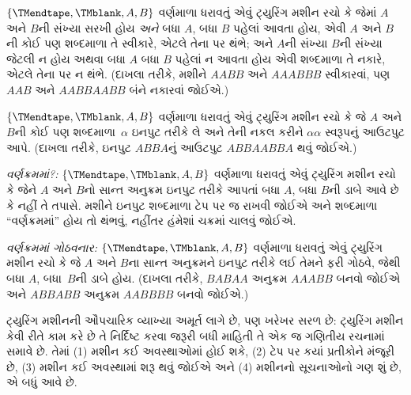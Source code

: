 \begin{prob}
$\{\TMendtape,\TMblank, A, B\}$ વર્ણમાળા ધરાવતું એવું
ટ્યુરિંગ મશીન રચો કે જેમાં $A$ અને $B$ની સંખ્યા સરખી
હોય \emph{અને} બધા $A$, બધા $B$ પહેલાં આવતા હોય,
એવી $A$ અને $B$ની કોઈ પણ શબ્દમાળા તે સ્વીકારે,
એટલે તેના પર થંભે; અને $A$ની સંખ્યા $B$ની સંખ્યા
જેટલી ન હોય અથવા બધા $A$ બધા $B$ પહેલાં ન આવતા
હોય એવી શબ્દમાળા તે નકારે, એટલે તેના પર ન થંભે.
(દાખલા તરીકે, મશીને $AABB$ અને $AAABBB$ સ્વીકારવાં,
પણ $AAB$ અને $AABBAABB$ બંને નકારવાં જોઈએ.)
\end{prob}

\begin{prob}
$\{\TMendtape,\TMblank, A, B\}$ વર્ણમાળા ધરાવતું એવું
ટ્યુરિંગ મશીન રચો કે જે $A$ અને $B$ની કોઈ પણ
શબ્દમાળા~$\alpha$ ઇનપુટ તરીકે લે અને તેની નકલ કરીને
$\alpha\alpha$ સ્વરૂપનું આઉટપુટ આપે. (દાખલા તરીકે,
ઇનપુટ $ABBA$નું આઉટપુટ $ABBAABBA$ થવું જોઈએ.)
\end{prob}

\begin{prob}
\emph{વર્ણક્રમમાં?:} $\{\TMendtape,\TMblank, A, B\}$ વર્ણમાળા
ધરાવતું એવું ટ્યુરિંગ મશીન રચો કે જેને $A$ અને $B$નો
સાન્ત અનુક્રમ ઇનપુટ તરીકે આપતાં બધા $A$, બધા $B$ની
ડાબે આવે છે કે નહીં તે તપાસે. મશીને ઇનપુટ શબ્દમાળા ટેપ
પર જ રાખવી જોઈએ અને શબ્દમાળા ``વર્ણક્રમમાં'' હોય તો
થંભવું, નહીંતર હંમેશાં ચક્રમાં ચાલવું જોઈએ.
\end{prob}

\begin{prob}
\emph{વર્ણક્રમમાં ગોઠવનાર:} $\{\TMendtape,\TMblank, A, B\}$
વર્ણમાળા ધરાવતું એવું ટ્યુરિંગ મશીન રચો કે જે $A$ અને
$B$ના સાન્ત અનુક્રમને ઇનપુટ તરીકે લઈ તેમને ફરી ગોઠવે,
જેથી બધા $A$, બધા~$B$ની ડાબે હોય. (દાખલા તરીકે,
$BABAA$ અનુક્રમ $AAABB$ બનવો જોઈએ અને $ABBABB$
અનુક્રમ $AABBBB$ બનવો જોઈએ.)
\end{prob}
\endgroup


\begingroup
\makeatletter{}\makeatother

\label{guunit:OLP-0256}


\begin{explain}
ટ્યુરિંગ મશીનની ઔપચારિક વ્યાખ્યા અમૂર્ત લાગે છે, પણ ખરેખર
સરળ છે: ટ્યુરિંગ મશીન કેવી રીતે કામ કરે છે તે નિર્દિષ્ટ કરવા
જરૂરી બધી માહિતી તે એક જ ગણિતીય રચનામાં સમાવે છે. તેમાં
(1) મશીન કઈ અવસ્થાઓમાં હોઈ શકે, (2) ટેપ પર કયાં પ્રતીકોને
મંજૂરી છે, (3) મશીન કઈ અવસ્થામાં શરૂ થવું જોઈએ અને
(4) મશીનનો સૂચનાઓનો ગણ શું છે, એ બધું આવે છે.
\end{explain}

